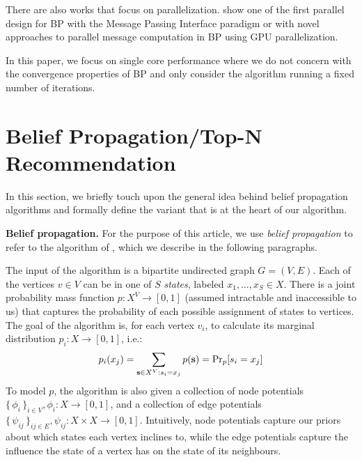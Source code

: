 \documentclass[letterpaper]{article}
\newcommand{\mypar}[1]{{\bf #1.}}
\begin{document}
There are also works that focus on parallelization. \citet{related2} show one of the first parallel design for BP with the Message Passing Interface paradigm or \citet{related3} with novel approaches to parallel message computation in BP using GPU parallelization.

In this paper, we focus on single core performance where we do not concern with the convergence properties of BP and only consider the algorithm running a fixed number of iterations.


\section{Belief Propagation/Top-N Recommendation}\label{sec:background}

In this section, we briefly touch upon the general idea behind belief
propagation algorithms and formally define the variant that is at the heart of
our algorithm.


\mypar{Belief propagation} For the purpose of this article, we use \emph{belief
propagation} to refer to the algorithm of \citet[Section
2.1]{top-n-recommendation}, which we describe in the following paragraphs.

The input of the algorithm is a bipartite undirected graph $G = (V, E)$. Each of the vertices $v\in V$ can
be in one of $S$ \emph{states}, labeled $x_1, \ldots, x_S \in X$. There is a
joint probability mass function $p: X^V \to [0, 1]$ (assumed intractable and
inaccessible to us) that captures the probability of each possible assignment of
states to vertices. The goal of the algorithm is, for each vertex $v_i$, to
calculate its marginal distribution $p_i: X \to [0, 1]$, i.e.:
%
$$p_i(x_j) = \sum_{\ves \in X^V: s_i = x_j} p(\ves) = \Pr_p[s_i = x_j]$$
%
To model $p$, the algorithm is also given a collection of node potentials
$\{\,\phi_i\,\}_{i \in V}, \phi_i: X \to [0, 1]$, and a collection of edge
potentials $\{\,\psi_{ij}\,\}_{ij \in E}, \psi_{ij}: X\times X \to [0, 1]$.
Intuitively, node potentials capture our priors about which states each vertex
inclines to, while the edge potentials capture the influence the state of a
vertex has on the state of its neighbours.
\end{document}

